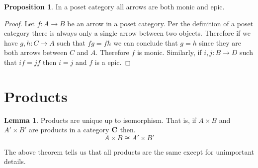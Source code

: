 \documentclass{article}
\theoremstyle{definition}
\newtheorem{proposition}{Proposition}
\newtheorem{lemma}{Lemma}
\newcommand{\arr}[3]{#1 : #2 \rightarrow #3}
\begin{document}
\begin{proposition}
  In a poset category all arrows are both monic and epic.
\end{proposition}
\begin{proof}
  Let $\arr{f}{A}{B}$ be an arrow in a poset category. Per the definition of a
  poset category there is always only a single arrow between two objects.
  Therefore if we have $\arr{g, h}{C}{A}$ such that $fg = fh$ we can conclude
  that $g = h$ since they are both arrows between $C$ and $A$. Therefore $f$ is
  monic. Similarly, if $\arr{i, j}{B}{D}$ such that $if = jf$ then $i = j$ and
  $f$ is a epic.
\end{proof}
\section{Products}

\begin{lemma}
  Products are unique up to isomorphism. That is, if $A \times B$ and $A' \times
  B'$ are products in a category $\bf{C}$ then.
  $$
  A \times B \cong A' \times B'
  $$
\end{lemma}

The above theorem tells us that all products are the same except for unimportant
details.
\end{document}
